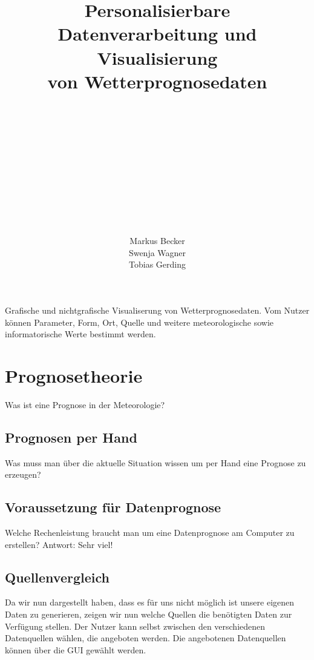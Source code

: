\documentclass[a4paper,oneside,10pt,titlepage]{article}
\begin{document}
\linespread{.9}
\pagestyle{empty}
\title{Personalisierbare\\Datenverarbeitung und Visualisierung\\von Wetterprognosedaten}
\author{\\\\\\\\\\\\\\\\\\\\\\Markus Becker\\Swenja Wagner\\Tobias Gerding}

\maketitle
\pagestyle{empty}
\tableofcontents
\thispagestyle{empty}
\pagestyle{plain}
\newpage

Grafische und nichtgrafische Visualiserung von Wetterprognosedaten. Vom Nutzer können Parameter, Form, Ort, Quelle und weitere meteorologische sowie informatorische Werte bestimmt werden.  
\section{Prognosetheorie}
Was ist eine Prognose in der Meteorologie?
\subsection{Prognosen per Hand}
Was muss man über die aktuelle Situation wissen um per Hand eine Prognose zu erzeugen?
\subsection{Voraussetzung für Datenprognose}
Welche Rechenleistung braucht man um eine Datenprognose am Computer zu erstellen? Antwort: Sehr viel!
\subsection{Quellenvergleich}
Da wir nun dargestellt haben, dass es für uns nicht möglich ist unsere eigenen Daten zu generieren, zeigen wir nun welche Quellen die benötigten Daten zur Verfügung stellen. Der Nutzer kann selbst zwischen den verschiedenen Datenquellen wählen, die angeboten werden. Die angebotenen Datenquellen können über die GUI gewählt werden.
\end{document}
